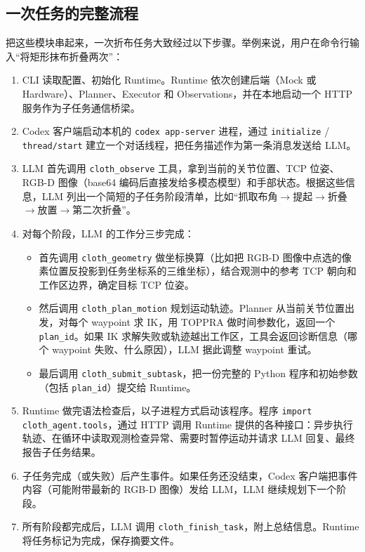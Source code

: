\subsection{一次任务的完整流程}
\label{subsec:agent-workflow}

把这些模块串起来，一次折布任务大致经过以下步骤。举例来说，用户在命令行输入``将矩形抹布折叠两次''：

\begin{enumerate}
  \item CLI 读取配置、初始化 Runtime。Runtime 依次创建后端（Mock 或 Hardware）、Planner、Executor 和 Observations，并在本地启动一个 HTTP 服务作为子任务通信桥梁。
  \item Codex 客户端启动本机的 \texttt{codex app-server} 进程，通过 \texttt{initialize} / \texttt{thread/start} 建立一个对话线程，把任务描述作为第一条消息发送给 LLM。
  \item LLM 首先调用 \texttt{cloth\_observe} 工具，拿到当前的关节位置、TCP 位姿、RGB-D 图像（base64 编码后直接发给多模态模型）和手部状态。根据这些信息，LLM 列出一个简短的子任务阶段清单，比如``抓取布角$\to$提起$\to$折叠$\to$放置$\to$第二次折叠''。
  \item 对每个阶段，LLM 的工作分三步完成：
    \begin{itemize}
      \item 首先调用 \texttt{cloth\_geometry} 做坐标换算（比如把 RGB-D 图像中点选的像素位置反投影到任务坐标系的三维坐标），结合观测中的参考 TCP 朝向和工作区边界，确定目标 TCP 位姿。
      \item 然后调用 \texttt{cloth\_plan\_motion} 规划运动轨迹。Planner 从当前关节位置出发，对每个 waypoint 求 IK，用 TOPPRA 做时间参数化，返回一个 \texttt{plan\_id}。如果 IK 求解失败或轨迹越出工作区，工具会返回诊断信息（哪个 waypoint 失败、什么原因），LLM 据此调整 waypoint 重试。
      \item 最后调用 \texttt{cloth\_submit\_subtask}，把一份完整的 Python 程序和初始参数（包括 \texttt{plan\_id}）提交给 Runtime。
    \end{itemize}
  \item Runtime 做完语法检查后，以子进程方式启动该程序。程序 \texttt{import cloth\_agent.tools}，通过 HTTP 调用 Runtime 提供的各种接口：异步执行轨迹、在循环中读取观测检查异常、需要时暂停运动并请求 LLM 回复、最终报告子任务结果。
  \item 子任务完成（或失败）后产生事件。如果任务还没结束，Codex 客户端把事件内容（可能附带最新的 RGB-D 图像）发给 LLM，LLM 继续规划下一个阶段。
  \item 所有阶段都完成后，LLM 调用 \texttt{cloth\_finish\_task}，附上总结信息。Runtime 将任务标记为完成，保存摘要文件。
\end{enumerate}

